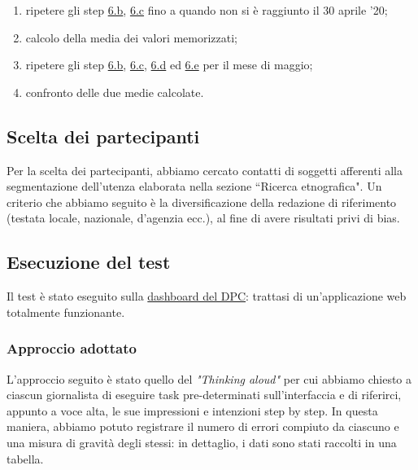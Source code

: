 \begin{enumerate}
\begin{enumerate}[label=\alph*.]
        \item ripetere gli step \hyperref[at:b]{6.b}, \hyperref[at:c]{6.c} fino a quando non si è raggiunto il 30 aprile '20; \label{at:d}
        \item calcolo della media dei valori memorizzati; \label{at:e}
        \item ripetere gli step \hyperref[at:b]{6.b}, \hyperref[at:c]{6.c}, \hyperref[at:d]{6.d} ed \hyperref[at:e]{6.e} per il mese di maggio; 
        \item confronto delle due medie calcolate.
    \end{enumerate}
\end{enumerate}

\subsection{Scelta dei partecipanti}
\label{ss:seclta-partecipanti}
Per la scelta dei partecipanti, abbiamo cercato contatti di soggetti afferenti alla segmentazione dell'utenza elaborata nella sezione ``Ricerca etnografica". Un criterio che abbiamo seguito è la diversificazione della redazione di riferimento (testata locale, nazionale, d'agenzia ecc.), al fine di avere risultati privi di bias.

\subsection{Esecuzione del test}
\label{ss:vre-esecuzione-test}
Il test è stato eseguito sulla \href{https://opendatadpc.maps.arcgis.com/apps/opsdashboard/index.html#/b0c68bce2cce478eaac82fe38d4138b1}{dashboard del DPC}: trattasi di un'applicazione web totalmente funzionante.
\subsubsection{Approccio adottato}
\label{sss:approccio-adottato}
L'approccio seguito è stato quello del \textit{"Thinking aloud"} per cui abbiamo chiesto a ciascun giornalista di eseguire task pre-determinati sull'interfaccia e di riferirci, appunto a voce alta, le sue impressioni e intenzioni step by step.
\noindent
In questa maniera, abbiamo potuto registrare il numero di errori compiuto da ciascuno e una misura di gravità degli stessi: in dettaglio, i dati sono stati raccolti in una tabella.

